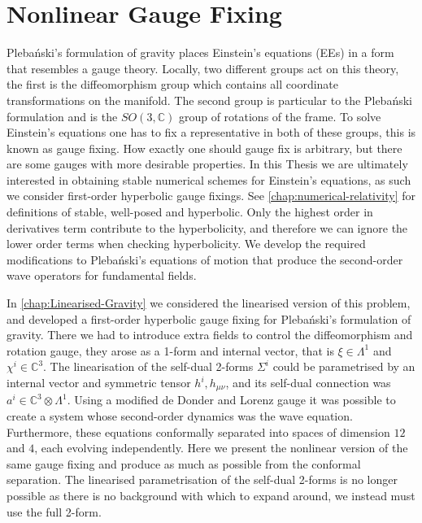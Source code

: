 \documentclass[10pt]{report}
\newcommand{\pleb}[0]{Pleba\'nski}
\theoremstyle{definition}
\newcommand{\C}[0]{\mathbb{C}}
\begin{document}
   \chapter{Nonlinear Gauge Fixing} \label{chap:nonlinear-gauge-fixing}
        \pleb{}'s formulation of gravity places Einstein's equations (EEs) in a form that resembles a gauge theory. Locally, two different groups act on this theory, the first is the diffeomorphism group which contains all coordinate transformations on the manifold. The second group is particular to the \pleb{} formulation and is the $SO(3,\C)$ group of rotations of the frame. To solve Einstein's equations one has to fix a representative in both of these groups, this is known as gauge fixing. How exactly one should gauge fix is arbitrary, but there are some gauges with more desirable properties. In this Thesis we are ultimately interested in obtaining stable numerical schemes for Einstein's equations, as such we consider first-order hyperbolic gauge fixings. See \cref{chap:numerical-relativity} for definitions of stable, well-posed and hyperbolic. Only the highest order in derivatives term contribute to the hyperbolicity, and therefore we can ignore the lower order terms when checking hyperbolicity. We develop the required modifications to \pleb{}'s equations of motion that produce the second-order wave operators for fundamental fields.

        In \cref{chap:Linearised-Gravity} we considered the linearised version of this problem, and developed a first-order hyperbolic gauge fixing for \pleb{}'s formulation of gravity. There we had to introduce extra fields to control the diffeomorphism and rotation gauge, they arose as a 1-form and internal vector, that is $\xi \in \Lambda^1$ and $\chi^i \in \C^3$. The linearisation of the self-dual 2-forms $\Sigma^i$ could be parametrised by an internal vector and symmetric tensor $h^i, h_{\mu\nu}$, and its self-dual connection was $a^i \in \C^3 \otimes \Lambda^1$. Using a modified de Donder and Lorenz gauge it was possible to create a system whose second-order dynamics was the wave equation. Furthermore, these equations conformally separated into spaces of dimension $12$ and $4$, each evolving independently. Here we present the nonlinear version of the same gauge fixing and produce as much as possible from the conformal separation. The linearised parametrisation of the self-dual 2-forms is no longer possible as there is no background with which to expand around, we instead must use the full 2-form. 
        
\end{document}
